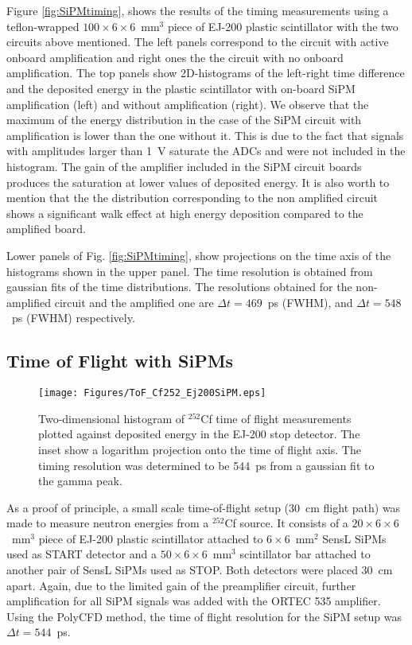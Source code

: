 Figure \ref{fig:SiPMtiming}, shows the results of the timing measurements using a  teflon-wrapped $100\times6\times6$~mm$^3$ piece of EJ-200 plastic scintillator with the two circuits above mentioned. The left panels correspond to the circuit with active onboard amplification and right ones the the circuit with no onboard amplification. The top panels show 2D-histograms of the left-right time difference and the deposited energy in the plastic scintillator with on-board SiPM amplification (left) and without amplification (right). We observe that the maximum of the energy distribution in the case of the SiPM circuit with amplification is lower than the one without it. This is due to the fact that signals with amplitudes larger than 1~V saturate the ADCs and were not included in the histogram. The gain of the amplifier included in the SiPM circuit boards produces the saturation at lower values of deposited energy. It is also worth to mention that the the distribution corresponding to the non amplified circuit shows a significant walk effect at high energy deposition compared to the amplified board.

Lower panels of Fig. \ref{fig:SiPMtiming}, show projections on the time axis of the histograms shown in the upper panel. The time resolution is obtained from  gaussian fits of the time distributions. The resolutions obtained for the non-amplified circuit and the amplified one are $\Delta t=469$~ps (FWHM), and $\Delta t=548$~ps (FWHM) respectively.

\subsection{Time of Flight with SiPMs}
\begin{figure}[hbt]
  \texttt{[image: Figures/ToF\_Cf252\_Ej200SiPM.eps]}
  \caption{Two-dimensional histogram of $^{252}$Cf time of flight measurements plotted against deposited energy in the EJ-200 stop detector. The inset show a logarithm projection onto the time of flight axis. The timing resolution was determined to be 544~ps from a gaussian fit to the gamma peak.}
  \label{fig:ToF_SiPM}
\end{figure}

As a proof of principle, a small scale time-of-flight setup (30~cm flight path) was made to measure neutron energies from a $^{252}$Cf source. It consists of a $20\times6\times6$~mm$^3$  piece of EJ-200 plastic scintillator attached to $6\times6$~mm$^2$ SensL\textsuperscript{\textregistered} SiPMs used as START detector and a  $50\times6\times6$~mm$^3$ scintillator bar attached to another pair of SensL\textsuperscript{\textregistered} SiPMs used as STOP. Both detectors were placed 30~cm apart. Again, due to the limited gain of the preamplifier circuit, further amplification for all SiPM signals was added with the ORTEC\textsuperscript{\textregistered} 535 amplifier. Using the PolyCFD method, the time of flight resolution for the SiPM setup was $\Delta t=544$~ps.

